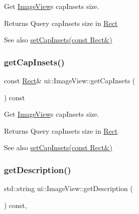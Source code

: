 Get \hyperlink{classui_1_1ImageView}{Image\+View}\textquotesingle{}s cap\+Insets size. \begin{DoxyReturn}{Returns}
Query cap\+Insets size in \hyperlink{classRect}{Rect} 
\end{DoxyReturn}
\begin{DoxySeeAlso}{See also}
{\ttfamily \hyperlink{classui_1_1ImageView_aaca6b6106d235cadd64a19cf2255f218}{set\+Cap\+Insets(const Rect\&)}} 
\end{DoxySeeAlso}
\mbox{\label{classui_1_1ImageView_aad585cd739b5ae6756be8b46542b297e}} 
\subsubsection{\texorpdfstring{get\+Cap\+Insets()}{getCapInsets()}\hspace{0.1cm}{\footnotesize\ttfamily [2/2]}}
{\footnotesize\ttfamily const \hyperlink{classRect}{Rect}\& ui\+::\+Image\+View\+::get\+Cap\+Insets (\begin{DoxyParamCaption}{ }\end{DoxyParamCaption}) const}

Get \hyperlink{classui_1_1ImageView}{Image\+View}\textquotesingle{}s cap\+Insets size. \begin{DoxyReturn}{Returns}
Query cap\+Insets size in \hyperlink{classRect}{Rect} 
\end{DoxyReturn}
\begin{DoxySeeAlso}{See also}
{\ttfamily \hyperlink{classui_1_1ImageView_aaca6b6106d235cadd64a19cf2255f218}{set\+Cap\+Insets(const Rect\&)}} 
\end{DoxySeeAlso}
\mbox{\label{classui_1_1ImageView_add3f735a7cee8c3192e9ee992446af12}} 
\subsubsection{\texorpdfstring{get\+Description()}{getDescription()}\hspace{0.1cm}{\footnotesize\ttfamily [1/2]}}
{\footnotesize\ttfamily std\+::string ui\+::\+Image\+View\+::get\+Description (\begin{DoxyParamCaption}{ }\end{DoxyParamCaption}) const\hspace{0.3cm}{\ttfamily [override]}, {\ttfamily [virtual]}}

